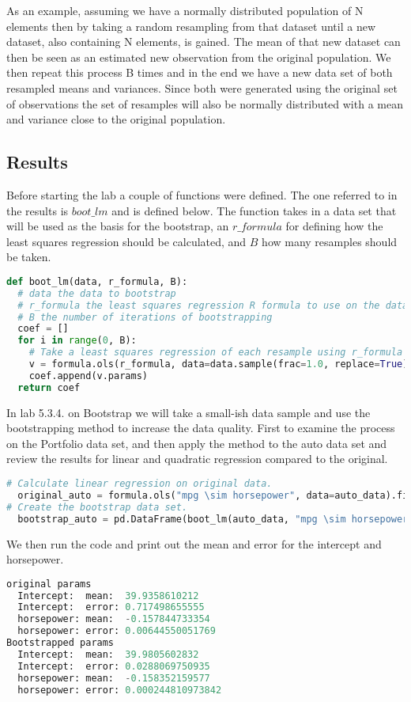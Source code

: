 As an example, assuming we have a normally distributed population of N elements then by taking a random resampling from that dataset until a new dataset, also containing N elements, is gained. The mean of that new dataset can then be seen as an estimated new observation from the original population. We then repeat this process B times and in the end we have a new data set of both resampled means and variances. Since both were generated using the original set of observations the set of resamples will also be normally distributed with a mean and variance close to the original population.
\fi

\subsection{Results}

Before starting the lab a couple of functions were defined. The one referred to in the results is $boot\_lm$ and is defined below. The function takes in a data set that will be used as the basis for the bootstrap, an $r\_formula$ for defining how the least squares regression should be calculated, and $B$ how many resamples should be taken.

\begin{lstlisting}[language=Python]
def boot_lm(data, r_formula, B):
  # data the data to bootstrap
  # r_formula the least squares regression R formula to use on the data
  # B the number of iterations of bootstrapping
  coef = []
  for i in range(0, B):
    # Take a least squares regression of each resample using r_formula
    v = formula.ols(r_formula, data=data.sample(frac=1.0, replace=True)).fit()
    coef.append(v.params)
  return coef
\end{lstlisting}

In lab 5.3.4. on Bootstrap we will take a small-ish data sample and use the bootstrapping method to increase the data quality. First to examine the process on the Portfolio data set, and then apply the method to the auto data set and review the results for linear and quadratic regression compared to the original.

\begin{lstlisting}[language=Python]
# Calculate linear regression on original data.
  original_auto = formula.ols("mpg \sim horsepower", data=auto_data).fit() 
# Create the bootstrap data set.
  bootstrap_auto = pd.DataFrame(boot_lm(auto_data, "mpg \sim horsepower", 1000)) 
\end{lstlisting}
We then run the code and print out the mean and error for the intercept and horsepower.
\begin{lstlisting}[language=Python]
original params
  Intercept:  mean:  39.9358610212
  Intercept:  error: 0.717498655555
  horsepower: mean:  -0.157844733354
  horsepower: error: 0.00644550051769
Bootstrapped params
  Intercept:  mean:  39.9805602832
  Intercept:  error: 0.0288069750935
  horsepower: mean:  -0.158352159577
  horsepower: error: 0.000244810973842
\end{lstlisting}

